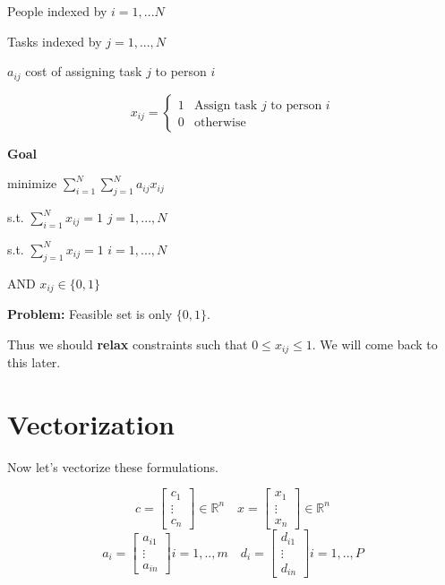 \documentclass[psamsfonts, 12pt]{amsart}
\theoremstyle{definition}
\theoremstyle{remark}
\newcommand{\R}{\mathbb{R}}
\begin{document}
People indexed by $i=1,...N$

Tasks indexed by $j=1,...,N$

$a_{ij}$ cost of assigning task $j$ to person $i$

\[ x_{ij} = \begin{cases} 
      1 & \text{Assign task } j \text{ to person } i \\
      0 & \text{otherwise}
   \end{cases}
\]

\textbf{Goal}
\begin{center}
    minimize $\sum_{i=1}^N\sum_{j=1}^Na_{ij}x_{ij}$
    
    s.t. $\sum_{i=1}^Nx_{ij}=1$ $j=1,...,N$ 
    
    s.t. $\sum_{j=1}^Nx_{ij}=1$ $i=1,...,N$ 
    
    AND $x_{ij} \in \{0,1\}$
\end{center}

\textbf{Problem:} Feasible set is only $\{0,1\}$. 

Thus we should \textbf{relax} constraints such that $0 \leq x_{ij} \leq 1$. We will come back to this later.


\section{Vectorization}


Now let's vectorize these formulations.

\[
    c = \begin{bmatrix}
        c_1 \\
        \vdots \\
        c_n
    \end{bmatrix} \in \R^n\quad x = \begin{bmatrix}
        x_1 \\
        \vdots \\
        x_n
    \end{bmatrix} \in \R^n
\]
\[
    a_i = \begin{bmatrix}
        a_{i1} \\
        \vdots \\
        a_{in}
    \end{bmatrix} i = 1,..,m \quad d_i = \begin{bmatrix}
        d_{i1} \\
        \vdots \\
        d_{in}
    \end{bmatrix} i = 1,..,P
\]
\end{document}
